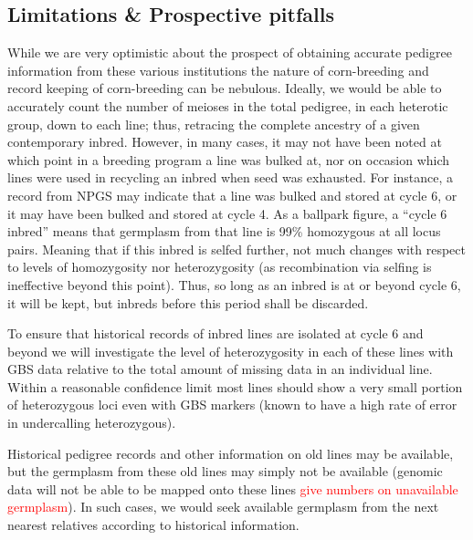 \documentclass[12pt]{article}
\begin{document}
\subsection*{Limitations \& Prospective pitfalls}
While we are very optimistic about the prospect of obtaining accurate pedigree information from these various institutions the nature of corn-breeding and record keeping of corn-breeding can be nebulous. Ideally, we would be able to accurately count the number of meioses in the total pedigree, in each heterotic group, down to each line; thus, retracing the complete ancestry of a given contemporary inbred. However, in many cases, it may not have been noted at which point in a breeding program a line was bulked at, nor on occasion which lines were used in recycling an inbred when seed was exhausted. For instance, a record from NPGS may indicate that a line was bulked and stored at cycle 6, or it may have been bulked and stored at cycle 4. As a ballpark figure, a ``cycle 6 inbred'' means that germplasm from that line is 99\% homozygous at all locus pairs. Meaning that if this inbred is selfed further, not much changes with respect to levels of homozygosity nor heterozygosity (as recombination via selfing is ineffective beyond this point).  Thus, so long as an inbred is at or beyond cycle 6, it will be kept, but inbreds before this period shall be discarded.

\par To ensure that historical records of inbred lines are isolated at cycle 6 and beyond we will investigate the level of heterozygosity in each of these lines with GBS data relative to the total amount of missing data in an individual line. Within a reasonable confidence limit most lines should show a very small portion of heterozygous loci even with GBS markers (known to have a high rate of error in undercalling heterozygous). 

\par Historical pedigree records and other information on old lines may be available, but the germplasm from these old lines may simply not be available (genomic data will not be able to be mapped onto these lines \textcolor{red}{give numbers on unavailable germplasm}). In such cases, we would seek available germplasm from the next nearest relatives according to historical information. 
\end{document}
